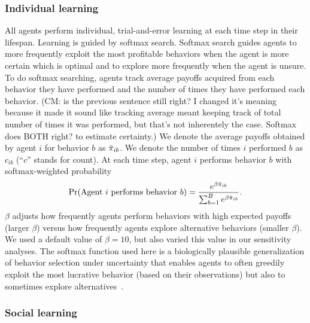 \documentclass[letterpaper,11.5pt]{scrartcl}
\newcommand{\cm}[1]{{\textcolor{mypurple} {({\tiny CM:} #1)}}}
\begin{document}
\subsubsection{Individual learning}

All agents perform individual, trial-and-error learning at each time step in
their lifespan.  Learning is guided by softmax search. Softmax search
guides agents to more frequently exploit the most profitable behaviors when the
agent is more certain which is optimal and to explore more frequently when the
agent is unsure.  To do softmax searching, agents track average payoffs acquired
from each behavior they have performed and the number of times they
have performed each behavior. \cm{is the previous sentence still right? I changed it's meaning because it made it sound like tracking average meant keeping track of total number of times it was performed, but that's not inherentely the case. Softmax does BOTH right? to estimate certainty.}  We denote the average payoffs obtained by agent $i$
for behavior $b$ as $\bar\pi_{ib}$. We denote the number of times $i$ performed $b$
as $c_{ib}$ (``$c$'' stands for count). 
At each time step, agent $i$ performs behavior $b$ with softmax-weighted probability
\begin{equation}
  \Pr(\text{Agent $i$ performs behavior $b$}) = 
    \frac{e^{\beta \bar\pi_{ib}}}{\sum_{b=1}^B e^{\beta \bar\pi_{ib}}}.
\end{equation}
\noindent
$\beta$ adjusts how frequently agents perform 
behaviors with high expected payoffs (larger $\beta$) versus how frequently
agents explore alternative behaviors (smaller $\beta$). %
We used a default value of $\beta = 10$, but also varied this value in our sensitivity analyses. 
The softmax function used here is a biologically plausible
generalization of behavior selection under uncertainty that enables agents to often
greedily exploit the most lucrative behavior (based on their observations) but also
to sometimes explore alternatives~\cite{Schulz2019,Collins2013,Daw2006,Yechiam2005}.


\subsubsection{Social learning}
\end{document}
